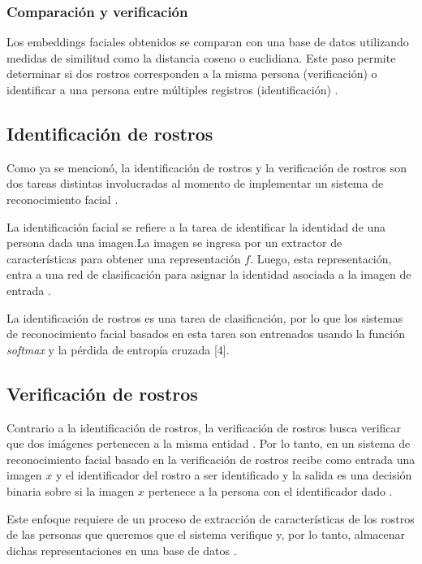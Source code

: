 \subsubsection{Comparación y verificación}

Los embeddings faciales obtenidos se comparan con una base de datos utilizando medidas de similitud como la distancia coseno o euclidiana. Este paso permite determinar si dos rostros corresponden a la misma persona (verificación) o identificar a una persona entre múltiples registros (identificación) \cite{L14}.


\subsection{Identificación de rostros}

Como ya se mencionó, la identificación de rostros y la verificación de rostros son dos tareas distintas involucradas al momento de implementar un sistema de reconocimiento facial \cite{L14}.

La identificación facial se refiere a la tarea de identificar la identidad de una persona dada una imagen.La imagen se ingresa por un extractor de características para obtener una representación $f$. Luego, esta representación, entra a una red de clasificación para asignar la identidad asociada a la imagen de entrada \cite{L15}.

La identificación de rostros es una tarea de clasificación, por lo que los sistemas de reconocimiento facial basados en esta tarea son entrenados usando la función \textit{softmax} y la pérdida de entropía cruzada [4].

\subsection{Verificación de rostros}

Contrario a la identificación de rostros, la verificación de rostros busca verificar que dos imágenes pertenecen a la misma entidad \cite{L14}. Por lo tanto, en un sistema de reconocimiento facial basado en la verificación de rostros recibe como entrada una imagen $x$ y el identificador del rostro a ser identificado y la salida es una decisión binaria sobre si la imagen $x$ pertenece a la persona con el identificador dado \cite{L15}.

Este enfoque requiere de un proceso de extracción de características de los rostros de las personas que queremos que el sistema verifique y, por lo tanto, almacenar dichas representaciones en una base de datos \cite{L15}.

